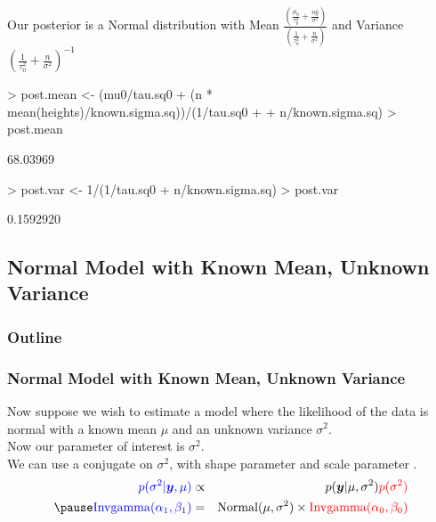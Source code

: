 \documentclass[handout]{beamer}
\begin{document}
\begin{frame}[fragile]
Our posterior is a Normal distribution with Mean $\frac{\left( \frac{\mu_0}{\tau_0^2} + \frac{n
\bar{y}}{\sigma^2}\right)}{\left( \frac{1}{\tau_0^2} +
\frac{n}{\sigma^2}\right)}$ and Variance $\left( \frac{1}{\tau_0^2} +
\frac{n}{\sigma^2} \right)^{-1}$
\medskip
\pause
\tiny
\begin{Schunk}
\begin{Sinput}
> post.mean <- (mu0/tau.sq0 + (n * mean(heights)/known.sigma.sq))/(1/tau.sq0 + 
+     n/known.sigma.sq)
> post.mean
\end{Sinput}
\begin{Soutput}
[1] 68.03969
\end{Soutput}
\begin{Sinput}
> post.var <- 1/(1/tau.sq0 + n/known.sigma.sq)
> post.var
\end{Sinput}
\begin{Soutput}
[1] 0.1592920
\end{Soutput}
\end{Schunk}
\normalsize
\end{frame}



\subsection{Normal Model with Known Mean, Unknown Variance}

\begin{frame}
\frametitle{Outline}
\tableofcontents[currentsubsection]
\end{frame}

\begin{frame}
\frametitle{Normal Model with Known Mean, Unknown Variance}
\pause
Now suppose we wish to estimate a model where the likelihood of the data
is normal with a known mean $\mu$ and an unknown variance $\sigma^2$.\\
\bigskip
\pause
Now our parameter of interest is $\sigma^2$. \\
\bigskip
\pause
We can use a conjugate  on $\sigma^2$, with
shape parameter  and scale parameter .
\bigskip
\pause
\begin{eqnarray*}
\blue{p(\sigma^2 | \bm{y}, \mu)} &\propto& p(\bm{y} | \mu, \sigma^2)
\red{p(\sigma^2)} \\
\pause
\blue{\mathrm{Invgamma}(\alpha_1, \beta_1)} &=& \mathrm{Normal}(\mu, \sigma^2)
\times \red{\mathrm{Invgamma}(\alpha_0, \beta_0)}
\end{eqnarray*}
\end{frame}
\end{document}
